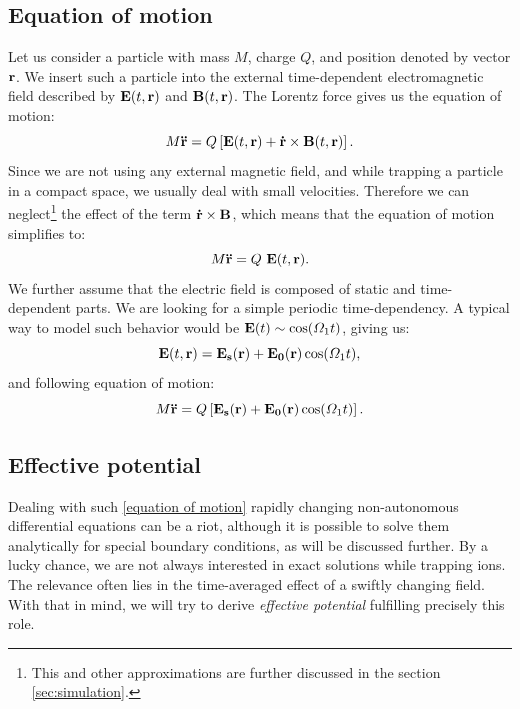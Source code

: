 \subsection{Equation of motion}
Let us consider a particle with mass $M$, charge $Q$, and position denoted by vector $\vb{r}$. We insert such a particle into the external time-dependent electromagnetic field described by $\vb{E}(t,\vb{r})$ and $\vb{B}(t,\vb{r})$. The Lorentz force gives us the equation of motion:
\begin{equation}
	M \vb{\ddot{r}} = Q \left[\vb{E}(t,\vb{r}) + \vb{\dot{r}} \times \vb{B}(t,\vb{r})\right].
\end{equation}
Since we are not using any external magnetic field, and while trapping a particle in a compact space, we usually deal with small velocities. Therefore we can neglect\footnote{This and other approximations are further discussed in the section \ref{sec:simulation}.} the effect of the term $\vb{\dot{r}} \times \vb{B}$, which means that the equation of motion simplifies to:
\begin{equation}
	M \vb{\ddot{r}} = Q \ \vb{E}(t,\vb{r}).
\end{equation}
We further assume that the electric field is composed of static and time-dependent parts. We are looking for a simple periodic time-dependency. A typical way to model such behavior would be $\vb{E}(t) \sim \cos(\Omega_1 t)$, giving us:
\begin{equation}
	\vb{E}(t,\vb{r}) = \vb{E_s}(\vb{r}) + \vb{E_0}(\vb{r}) \cos(\Omega_1 t),
\end{equation}
and following equation of motion:
\begin{equation}
	\label{equation of motion}
	M \vb{\ddot{r}} = Q \left[ \vb{E_s}(\vb{r}) + \vb{E_0}(\vb{r}) \cos(\Omega_1 t) \right].
\end{equation}

\subsection{Effective potential}
Dealing with such \eqref{equation of motion} rapidly changing non-autonomous differential equations can be a riot, although it is possible to solve them analytically for special boundary conditions, as will be discussed further. By a lucky chance, we are not always interested in exact solutions while trapping ions. The relevance often lies in the time-averaged effect of a swiftly changing field. With that in mind, we will try to derive \emph{effective potential} fulfilling precisely this role.

